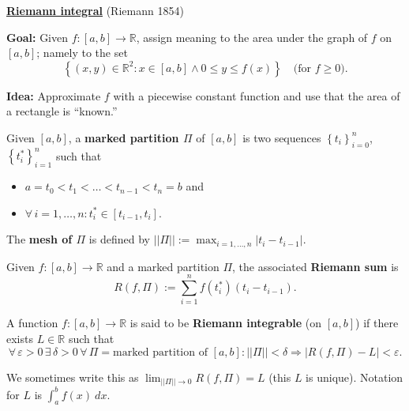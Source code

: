 \documentclass{notes}
\begin{document}
  {\boldmath \bfseries \underline{Riemann integral}} (Riemann 1854)
  
  {\boldmath \bfseries Goal:} Given $f \colon [a, b] \to \mathbb R$, assign meaning to the area under the graph of $f$ on $[a, b]$; namely to the set 
  \[
    \left \{ (x, y) \in \mathbb R^2 : x \in [a, b] \land 0 \leq y \leq f(x) \right \} \quad \text{(for $f \geq 0$)}.
  \]
  
  {\boldmath \bfseries Idea:} Approximate $f$ with a piecewise constant function and use that the area of a rectangle is ``known.''
  
  \begin{defn}
    Given $[a, b]$, a {\boldmath \bfseries marked partition $\Pi$} of $[a, b]$ is two sequences $\left \{ t_i \right \}_{i = 0}^n$, $\left \{ t^*_i \right \}_{i = 1}^n$ such that 
    \begin{itemize}
      \item $a = t_0 < t_1 < \dots < t_{n - 1} < t_n = b$ and 

      \item $\forall \, i = 1, \dots, n: t^*_i \in [t_{i - 1}, t_i]$.
    \end{itemize}
  \end{defn}
  
  \begin{defn}
    The {\boldmath \bfseries mesh of $\Pi$} is defined by $|| \Pi || := \max_{i = 1, \dots, n} \left | t_i - t_{i - 1} \right |$.
  \end{defn}
  
  \begin{defn}
    Given $f \colon [a, b] \to \mathbb R$ and a marked partition $\Pi$, the associated {\boldmath \bfseries Riemann sum} is 
    \[
      R(f, \Pi) := \sum_{i = 1}^n f(t^*_i) (t_i - t_{i - 1}).
    \]
  \end{defn}
  
  \newpage
  
  \begin{defn}
    A function $f \colon [a, b] \to \mathbb R$ is said to be {\boldmath \bfseries Riemann integrable} (on $[a, b]$) if there exists $L \in \mathbb R$ such that 
    \[
      \forall \, \varepsilon > 0 \, \exists \, \delta > 0 \, \forall \, \Pi = \text{marked partition of $[a, b]$}: || \Pi || < \delta \Rightarrow \left | R(f, \Pi) - L \right | < \varepsilon.
    \]
    
    We sometimes write this as $\lim_{|| \Pi || \to 0} R(f, \Pi) = L$ (this $L$ is unique).
    Notation for $L$ is $\int_a^b f(x)\ dx$.
  \end{defn}
  
\end{document}
